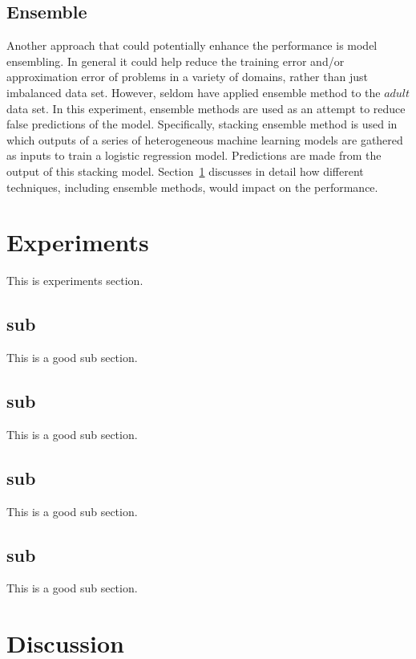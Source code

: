 \documentclass{article}
\begin{document}
\subsection{Ensemble}
\label{ensemble}

Another approach that could potentially enhance the performance is model ensembling. In general it could help reduce the training error and/or approximation error of problems in a variety of domains, rather than just imbalanced data set. However, seldom have applied ensemble method to the $adult$ data set. In this experiment, ensemble methods are used as an attempt to reduce false predictions of the model. Specifically, stacking ensemble method is used in which outputs of a series of heterogeneous machine learning models are gathered as inputs to train a logistic regression model. Predictions are made from the output of this stacking model. Section~\ref{experiments} discusses in detail how different techniques, including ensemble methods, would impact on the performance.

\section{Experiments}
\label{experiments}

This is experiments section.

\subsection{sub}

This is a good sub section.

\subsection{sub}

This is a good sub section.

\subsection{sub}

This is a good sub section.

\subsection{sub}

This is a good sub section.

\section{Discussion}
\end{document}

